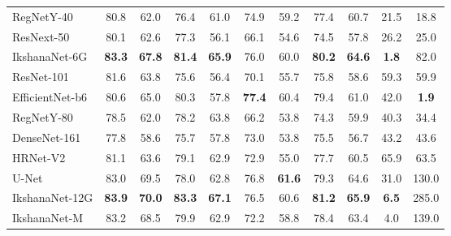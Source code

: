 \documentclass{article}
\begin{document}
\begin{table}[ht]
\begin{adjustbox}{width=1\textwidth}
\begin{tabular}{lSSSSSSSSSS}
     RegNetY-40\cite{RegNet}& 80.8 & 62.0 & 76.4 & 61.0 & 74.9 & 59.2 & 77.4 &60.7 &21.5 & 18.8   \\
     ResNext-50 \cite{Resnext}& 80.1 & 62.6 & 77.3 &56.1  &66.1  &54.6  & 74.5 &57.8 & 26.2 & 25.0  \\
     IkshanaNet-6G & \bfseries 83.3  & \bfseries 67.8 & \bfseries 81.4 &  \bfseries 65.9  &76.0  & 60.0 & \bfseries 80.2 & \bfseries 64.6 & \bfseries 1.8 & 82.0 \\
     \midrule
     ResNet-101\cite{he2016deep}& 81.6 & 63.8 &75.6 & 56.4  & 70.1 & 55.7  & 75.8 &58.6 & 59.3 & 59.9   \\
     EfficientNet-b6\cite{TanL19}& 80.6 &65.0  & 80.3 & 57.8 & \bfseries 77.4 & 60.4 & 79.4 & 61.0 & 42.0 & \bfseries 1.9  \\
     RegNetY-80\cite{RegNet}& 78.5 & 62.0 & 78.2 &63.8  & 66.2 & 53.8 &  74.3&  59.9 & 40.3 & 34.4 \\
     DenseNet-161\cite{huang2017densely}&77.8  & 58.6 & 75.7 & 57.8 & 73.0 &53.8  & 75.5 &56.7 & 43.2 & 43.6    \\
     HRNet-V2\cite{SunZJCXLMWLW19} & 81.1  & 63.6 & 79.1 & 62.9 & 72.9 & 55.0  & 77.7 & 60.5 & 65.9 & 63.5    \\
     U-Net\cite{ronneberger2015u} & 83.0 & 69.5 & 78.0 &62.8  & 76.8  & \bfseries 61.6  &79.3& 64.6 & 31.0 & 130.0  \\
     IkshanaNet-12G & \bfseries 83.9 & \bfseries 70.0 & \bfseries 83.3 & \bfseries  67.1 &  76.5  & 60.6 & \bfseries 81.2  & \bfseries 65.9 & \bfseries 6.5 & 285.0   \\
     \midrule
    IkshanaNet-M & 83.2 &68.5  & 79.9 &62.9  &72.2  & 58.8 & 78.4 & 63.4  & 4.0 & 139.0 \\
    \bottomrule
  \end{tabular}
  \end{adjustbox}
  \label{table-4}
\end{table}
\end{document}
